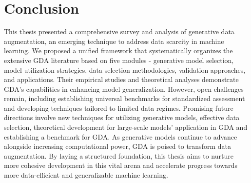 \documentclass[preprint,12pt,authoryear]{elsarticle}
\begin{document}
\section{Conclusion}
This thesis presented a comprehensive survey and analysis of generative data augmentation, an emerging technique to address data scarcity in machine learning. We proposed a unified framework that systematically organizes the extensive GDA literature based on five modules - generative model selection, model utilization strategies, data selection methodologies, validation approaches, and applications. Their empirical studies and theoretical analyses demonstrate GDA's capabilities in enhancing model generalization. However, open challenges remain, including establishing universal benchmarks for standardized assessment and developing techniques tailored to limited data regimes. Promising future directions involve new techniques for utilizing generative models, effective data selection, theoretical development for large-scale models' application in GDA and establishing a benchmark for GDA. As generative models continue to advance alongside increasing computational power, GDA is poised to transform data augmentation. By laying a structured foundation, this thesis aims to nurture more cohesive development in this vital arena and accelerate progress towards more data-efficient and generalizable machine learning.



\end{document}
